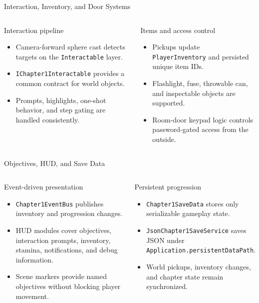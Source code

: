\documentclass[aspectratio=169,10pt]{beamer}
\begin{document}
\begin{frame}{Interaction, Inventory, and Door Systems}
  \begin{columns}[T,onlytextwidth]
    \begin{block}{Interaction pipeline}
      \begin{itemize}
        \item Camera-forward sphere cast detects targets on the \texttt{Interactable} layer.
        \item \texttt{IChapter1Interactable} provides a common contract for world objects.
        \item Prompts, highlights, one-shot behavior, and step gating are handled consistently.
      \end{itemize}
    \end{block}
    \begin{block}{Items and access control}
      \begin{itemize}
        \item Pickups update \texttt{PlayerInventory} and persisted unique item IDs.
        \item Flashlight, fuse, throwable can, and inspectable objects are supported.
        \item Room-door keypad logic controls password-gated access from the outside.
      \end{itemize}
    \end{block}
  \end{columns}
\end{frame}

\begin{frame}{Objectives, HUD, and Save Data}
  \begin{columns}[T,onlytextwidth]
    \begin{block}{Event-driven presentation}
      \begin{itemize}
        \item \texttt{Chapter1EventBus} publishes inventory and progression changes.
        \item HUD modules cover objectives, interaction prompts, inventory, stamina, notifications, and debug information.
        \item Scene markers provide named objectives without blocking player movement.
      \end{itemize}
    \end{block}
    \begin{block}{Persistent progression}
      \begin{itemize}
        \item \texttt{Chapter1SaveData} stores only serializable gameplay state.
        \item \texttt{JsonChapter1SaveService} saves JSON under \texttt{Application.persistentDataPath}.
        \item World pickups, inventory changes, and chapter state remain synchronized.
      \end{itemize}
    \end{block}
  \end{columns}
\end{frame}
\end{document}
